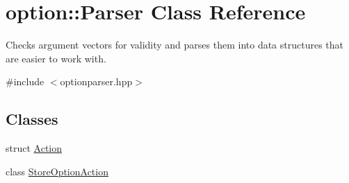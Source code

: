 \hypertarget{classoption_1_1Parser}{}\section{option\+:\+:Parser Class Reference}
\label{classoption_1_1Parser}


Checks argument vectors for validity and parses them into data structures that are easier to work with.  




{\ttfamily \#include $<$optionparser.\+hpp$>$}

\subsection*{Classes}
\begin{DoxyCompactItemize}
\item 
struct \hyperlink{structoption_1_1Parser_1_1Action}{Action}
\item 
class \hyperlink{classoption_1_1Parser_1_1StoreOptionAction}{Store\+Option\+Action}
\end{DoxyCompactItemize}
